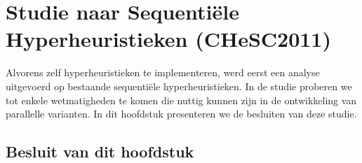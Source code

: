 \chapter{Studie naar Sequenti\"ele Hyperheuristieken (CHeSC2011)}


Alvorens zelf hyperheuristieken te implementeren, werd eerst een analyse uitgevoerd op bestaande sequenti\"ele hyperheuristieken. In de studie proberen we tot enkele wetmatigheden te komen die nuttig kunnen zijn in de ontwikkeling van parallelle varianten. In dit hoofdstuk presenteren we de besluiten van deze studie.









\section{Besluit van dit hoofdstuk}




